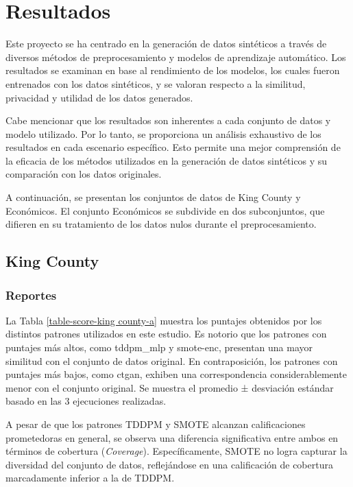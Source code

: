 \chapter{Resultados}
Este proyecto se ha centrado en la generación de datos sintéticos a través de diversos métodos de preprocesamiento y modelos de aprendizaje automático. Los resultados se examinan en base al rendimiento de los modelos, los cuales fueron entrenados con los datos sintéticos, y se valoran respecto a la similitud, privacidad y utilidad de los datos generados.

Cabe mencionar que los resultados son inherentes a cada conjunto de datos y modelo utilizado. Por lo tanto, se proporciona un análisis exhaustivo de los resultados en cada escenario específico. Esto permite una mejor comprensión de la eficacia de los métodos utilizados en la generación de datos sintéticos y su comparación con los datos originales.

A continuación, se presentan los conjuntos de datos de King County y Económicos. El conjunto Económicos se subdivide en dos subconjuntos, que difieren en su tratamiento de los datos nulos durante el preprocesamiento.

\newpage
\section{King County}
\subsection{Reportes}
La Tabla \ref{table-score-king county-a} muestra los puntajes obtenidos por los distintos patrones utilizados en este estudio. Es notorio que los patrones con puntajes más altos, como tddpm\_mlp y smote-enc, presentan una mayor similitud con el conjunto de datos original. En contraposición, los patrones con puntajes más bajos, como ctgan, exhiben una correspondencia considerablemente menor con el conjunto original. Se muestra el promedio ± desviación estándar basado en las 3 ejecuciones realizadas.

    
A pesar de que los patrones TDDPM y SMOTE alcanzan calificaciones prometedoras en general, se observa una diferencia significativa entre ambos en términos de cobertura (\emph{Coverage}). Específicamente, SMOTE no logra capturar la diversidad del conjunto de datos, reflejándose en una calificación de cobertura marcadamente inferior a la de TDDPM.

